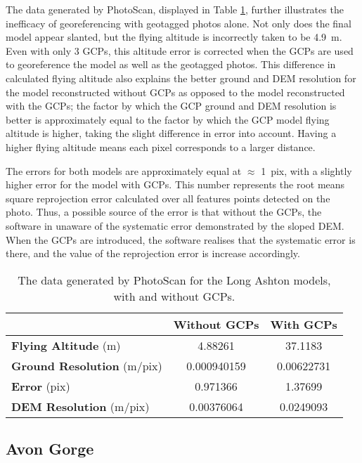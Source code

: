 The data generated by PhotoScan, displayed in Table \ref{tab:long-ashton},
further illustrates the inefficacy of georeferencing with geotagged photos
alone. Not only does the final model appear slanted, but the flying altitude is
incorrectly taken to be \SI{4.9}{m}. Even with only 3 GCPs, this altitude error
is corrected when the GCPs are used to georeference the model as well as the
geotagged photos. This difference in calculated flying altitude also explains
the better ground and DEM resolution for the model reconstructed without GCPs as
opposed to the model reconstructed with the GCPs; the factor by which the GCP
ground and DEM resolution is better is approximately equal to the factor by
which the GCP model flying altitude is higher, taking the slight difference in
error into account. Having a higher flying altitude means each pixel corresponds
to a larger distance.

The errors for both models are approximately equal at $\approx$ \SI{1}{pix},
with a slightly higher error for the model with GCPs. This number
represents the root means square reprojection error calculated over all features
points detected on the photo. Thus, a possible source of the error is that
without the GCPs, the software in unaware of the systematic error demonstrated
by the sloped DEM. When the GCPs are introduced, the software realises that the
systematic error is there, and the value of the reprojection error is increase
accordingly.

\begin{table}
    \begin{tabular}{| l | c | c |}
        \hline
        & \textbf{Without GCPs} & \textbf{With GCPs} \\
        \hline
        \textbf{Flying Altitude} (m)       & 4.88261     & 37.1183    \\
        \textbf{Ground Resolution} (m/pix) & 0.000940159 & 0.00622731 \\
        \textbf{Error} (pix)               & 0.971366    & 1.37699    \\
        \textbf{DEM Resolution} (m/pix)    & 0.00376064  & 0.0249093  \\
        \hline
    \end{tabular}
    \caption{The data generated by PhotoScan for the Long Ashton models, with
    and without GCPs.}
    \label{tab:long-ashton}
\end{table}

\subsection{Avon Gorge}
\label{sec:results/avon-gorge}

